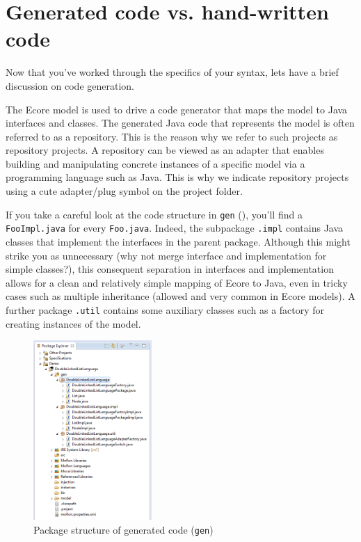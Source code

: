 \newpage
\genHeader
\hypertarget{codeGen common}{} 
\section{Generated code vs. hand-written code}

Now that you've worked through the specifics of your syntax, lets have a brief discussion on code generation.

The Ecore model is used to drive a code generator that maps the model to Java interfaces and classes. The generated Java code that represents the model is often
referred to as a repository. This is the reason why we refer to such projects as repository projects. A repository can be viewed as an adapter that enables
building and manipulating concrete instances of a specific model via a programming language such as Java. This is why we indicate repository projects using a
cute adapter/plug symbol on the project folder.

If you take a careful look at the code structure in \texttt{gen} (), you'll find a \texttt{FooImpl.java} for every
\texttt{Foo.java}. Indeed, the subpackage \texttt{.impl} contains Java classes that implement the interfaces in the parent package. Although this might strike
you as unnecessary (why not merge interface and implementation for simple classes?), this consequent separation in interfaces and implementation allows for a
clean and relatively simple mapping of Ecore to Java, even in tricky cases such as multiple inheritance (allowed and very common in Ecore models). A further
package \texttt{.util} contains some auxiliary classes such as a factory for creating instances of the model.

 \begin{figure}[htbp]
  \centering
  \includegraphics[width=0.4\textwidth]{../../org.moflon.doc.handbook.01_installation/5_codeGeneration/eclipse_structureGen}
  \caption{Package structure of generated code (\texttt{gen})}
  \label{eclipse:structureGen}
\end{figure}

